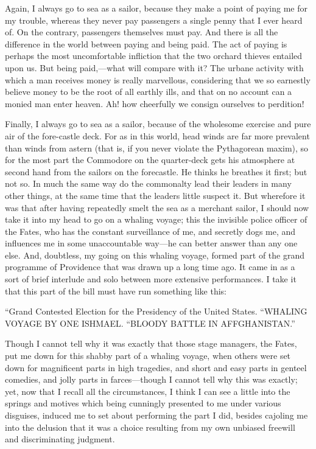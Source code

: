 \documentclass[12pt,ebook,oneside,openany]{memoir} %
\begin{document}
Again, I always go to sea as a sailor, because they make a point of paying me for my trouble, whereas they never pay passengers a single penny that I ever heard of. On the contrary, passengers themselves must pay. And there is all the difference in the world between paying and being paid. The act of paying is perhaps the most uncomfortable infliction that the two orchard thieves entailed upon us. But being paid,—what will compare with it? The urbane activity with which a man receives money is really marvellous, considering that we so earnestly believe money to be the root of all earthly ills, and that on no account can a monied man enter heaven. Ah! how cheerfully we consign ourselves to perdition!

Finally, I always go to sea as a sailor, because of the wholesome exercise and pure air of the fore-castle deck. For as in this world, head winds are far more prevalent than winds from astern (that is, if you never violate the Pythagorean maxim), so for the most part the Commodore on the quarter-deck gets his atmosphere at second hand from the sailors on the forecastle. He thinks he breathes it first; but not so. In much the same way do the commonalty lead their leaders in many other things, at the same time that the leaders little suspect it. But wherefore it was that after having repeatedly smelt the sea as a merchant sailor, I should now take it into my head to go on a whaling voyage; this the invisible police officer of the Fates, who has the constant surveillance of me, and secretly dogs me, and influences me in some unaccountable way—he can better answer than any one else. And, doubtless, my going on this whaling voyage, formed part of the grand programme of Providence that was drawn up a long time ago. It came in as a sort of brief interlude and solo between more extensive performances. I take it that this part of the bill must have run something like this:

\begin{displayquote}
“Grand Contested Election for the Presidency of the United States. “WHALING VOYAGE BY ONE ISHMAEL. “BLOODY BATTLE IN AFFGHANISTAN.”
\end{displayquote}

Though I cannot tell why it was exactly that those stage managers, the Fates, put me down for this shabby part of a whaling voyage, when others were set down for magnificent parts in high tragedies, and short and easy parts in genteel comedies, and jolly parts in farces—though I cannot tell why this was exactly; yet, now that I recall all the circumstances, I think I can see a little into the springs and motives which being cunningly presented to me under various disguises, induced me to set about performing the part I did, besides cajoling me into the delusion that it was a choice resulting from my own unbiased freewill and discriminating judgment.
\end{document}
